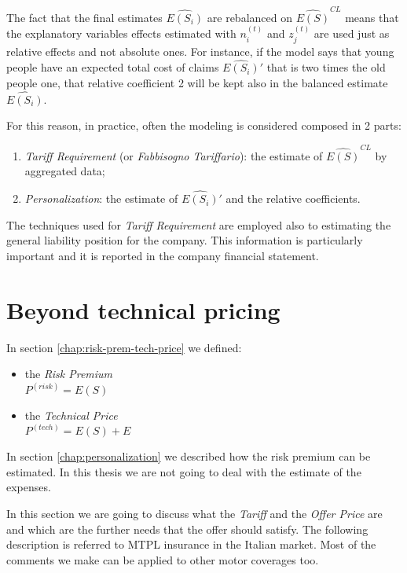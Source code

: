 \documentclass[a4paper, nobind]{templates/ociamthesis}
\providecommand{\tightlist}{%
  \setlength{\itemsep}{0pt}\setlength{\parskip}{0pt}}
\theoremstyle{definition}
\theoremstyle{definition}
\theoremstyle{definition}
\theoremstyle{remark}
\begin{document}
The fact that the final estimates \(\widehat{E(S_i)}\) are rebalanced on \(\widehat{E(S)}^{CL}\) means that the explanatory variables effects estimated with \(n_i^{(t)}\) and \(z_j^{(t)}\) are used just as relative effects and not absolute ones. For instance, if the model says that young people have an expected total cost of claims \(\widehat{E(S_i)}'\) that is two times the old people one, that relative coefficient 2 will be kept also in the balanced estimate \(\widehat{E(S_i)}\).

For this reason, in practice, often the modeling is considered composed in 2 parts:

\begin{enumerate}
\def\labelenumi{\arabic{enumi}.}
\tightlist
\item
  \emph{Tariff Requirement} (or \emph{Fabbisogno Tariffario}): the estimate of \(\widehat{E(S)}^{CL}\) by aggregated data;
\item
  \emph{Personalization}: the estimate of \(\widehat{E(S_i)}'\) and the relative coefficients.
\end{enumerate}

The techniques used for \emph{Tariff Requirement} are employed also to estimating the general liability position for the company. This information is particularly important and it is reported in the company financial statement.

\hypertarget{beyond-technical-pricing}{%
\section{Beyond technical pricing}\label{beyond-technical-pricing}}

In section \ref{chap:risk-prem-tech-price} we defined:

\begin{itemize}
\tightlist
\item
  the \emph{Risk Premium}\\
  \(P^{(risk)} = E(S)\)
\item
  the \emph{Technical Price}\\
  \(P^{(tech)} = E(S) + E\)
\end{itemize}

In section \ref{chap:personalization} we described how the risk premium can be estimated. In this thesis we are not going to deal with the estimate of the expenses.

In this section we are going to discuss what the \emph{Tariff} and the \emph{Offer Price} are and which are the further needs that the offer should satisfy. The following description is referred to MTPL insurance in the Italian market. Most of the comments we make can be applied to other motor coverages too.
\end{document}
